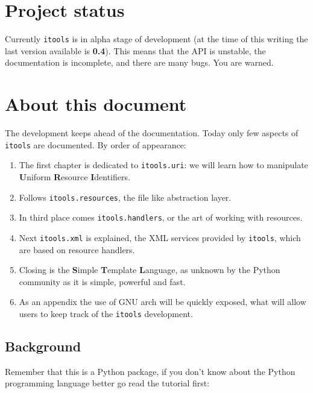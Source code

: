 \section{Project status}

Currently {\tt itools} is in alpha stage of development (at the time of
this writing the last version available is {\bf 0.4}). This means that the
API is unstable, the documentation is incomplete, and there are many bugs.
You are warned.

\section{About this document}

The development keeps ahead of the documentation. Today only few aspects
of {\tt itools} are documented. By order of appearance:

\begin{enumerate}
  \item The first chapter is dedicated to {\tt itools.uri}: we will learn how
    to manipulate {\bf U}niform {\bf R}esource {\bf I}dentifiers.

  \item Follows {\tt itools.resources}, the file like abstraction layer.

  \item In third place comes {\tt itools.handlers}, or the art of working
    with resources.

  \item Next {\tt itools.xml} is explained, the XML services provided by
    {\tt itools}, which are based on resource handlers.

  \item Closing is the {\bf S}imple {\bf T}emplate {\bf L}anguage, as unknown
    by the Python community as it is simple, powerful and fast.

  \item As an appendix the use of GNU arch will be quickly exposed, what
    will allow users to keep track of the {\tt itools} development.
\end{enumerate}


\subsection{Background}

Remember that this is a Python package, if you don't know about the Python
programming language better go read the tutorial first:

